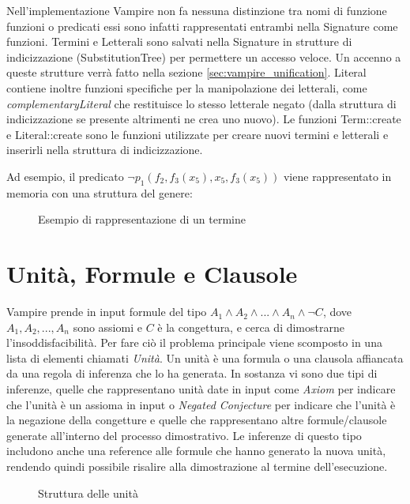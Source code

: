 \documentclass[./main.tex]{subfiles}
\begin{document}
Nell'implementazione Vampire non fa nessuna distinzione tra nomi di funzione funzioni o predicati essi sono infatti rappresentati
entrambi nella Signature come funzioni. 
Termini e Letterali sono salvati nella Signature in strutture di indicizzazione (SubstitutionTree) per permettere un accesso veloce.
Un accenno a queste strutture verrà fatto nella sezione \ref{sec:vampire_unification}.
Literal contiene inoltre funzioni specifiche per la manipolazione dei letterali, come \textit{complementaryLiteral} 
che restituisce lo stesso letterale negato (dalla struttura di indicizzazione se presente altrimenti ne crea uno nuovo).
Le funzioni Term::create e Literal::create sono le funzioni utilizzate per creare nuovi termini e letterali e inserirli nella struttura di indicizzazione.

Ad esempio, il predicato $\lnot p_1(f_2,f_3(x_5), x_5, f_3(x_5))$ viene rappresentato in memoria con una struttura del genere:

\begin{figure}[H]
    \centering
    \scalebox{0.55}{    
        
    }
    \caption{Esempio di rappresentazione di un termine}
    \label{fig:vampire_term_example}
\end{figure}




\section{Unità, Formule e Clausole} \label{sec:vampire_formula}
Vampire prende in input formule del tipo $A_1 \land A_2 \land ... \land A_n \land \lnot C$,
dove $A_1, A_2, ..., A_n$ sono assiomi e $C$ è la congettura,
e cerca di dimostrarne l'insoddisfacibilità.
Per fare ciò il problema principale viene scomposto in una lista di elementi chiamati \textit{Unità}.
Un unità è una formula o una clausola affiancata da una regola di inferenza che lo ha generata.
In sostanza vi sono due tipi di inferenze, quelle che rappresentano unità date in input
come \textit{Axiom} per indicare che l'unità è un assioma in input o
\textit{Negated Conjecture} per indicare che l'unità è la negazione della congetture
e quelle che rappresentano altre formule/clausole generate all'interno del processo dimostrativo.
Le inferenze di questo tipo includono anche una reference alle formule che hanno generato la nuova unità,
rendendo quindi possibile risalire alla dimostrazione al termine dell'esecuzione.


\begin{figure}[H]
    \centering
    \scalebox{0.55}{
        
    }
    \caption{Struttura delle unità}
    \label{fig:vampire_units}
\end{figure}
\end{document}
